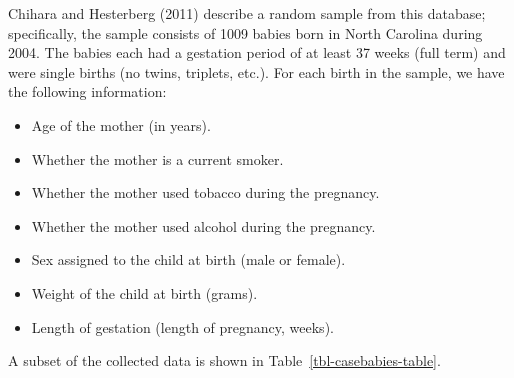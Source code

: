 \documentclass[
  letterpaper,
  DIV=11,
  numbers=noendperiod]{scrreprt}
\providecommand{\tightlist}{%
  \setlength{\itemsep}{0pt}\setlength{\parskip}{0pt}}\usepackage{longtable,booktabs,array}
\theoremstyle{definition}
\theoremstyle{definition}
\theoremstyle{plain}
\theoremstyle{remark}
\begin{document}
Chihara and Hesterberg (2011) describe a random sample from this
database; specifically, the sample consists of 1009 babies born in North
Carolina during 2004. The babies each had a gestation period of at least
37 weeks (full term) and were single births (no twins, triplets, etc.).
For each birth in the sample, we have the following information:

\begin{itemize}
\tightlist
\item
  Age of the mother (in years).
\item
  Whether the mother is a current smoker.
\item
  Whether the mother used tobacco during the pregnancy.
\item
  Whether the mother used alcohol during the pregnancy.
\item
  Sex assigned to the child at birth (male or female).
\item
  Weight of the child at birth (grams).
\item
  Length of gestation (length of pregnancy, weeks).
\end{itemize}

A subset of the collected data is shown in
Table~\ref{tbl-casebabies-table}.
\end{document}
